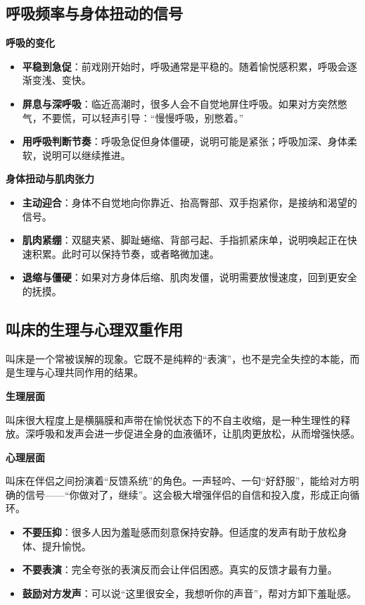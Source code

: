 \documentclass[12pt,UTF8]{ctexbook}
\begin{document}
\subsection{呼吸频率与身体扭动的信号}

\textbf{呼吸的变化}

\begin{itemize}
\item \textbf{平稳到急促}：前戏刚开始时，呼吸通常是平稳的。随着愉悦感积累，呼吸会逐渐变浅、变快。
\item \textbf{屏息与深呼吸}：临近高潮时，很多人会不自觉地屏住呼吸。如果对方突然憋气，不要慌，可以轻声引导：“慢慢呼吸，别憋着。”
\item \textbf{用呼吸判断节奏}：呼吸急促但身体僵硬，说明可能是紧张；呼吸加深、身体柔软，说明可以继续推进。
\end{itemize}

\textbf{身体扭动与肌肉张力}

\begin{itemize}
\item \textbf{主动迎合}：身体不自觉地向你靠近、抬高臀部、双手抱紧你，是接纳和渴望的信号。
\item \textbf{肌肉紧绷}：双腿夹紧、脚趾蜷缩、背部弓起、手指抓紧床单，说明唤起正在快速积累。此时可以保持节奏，或者略微加速。
\item \textbf{退缩与僵硬}：如果对方身体后缩、肌肉发僵，说明需要放慢速度，回到更安全的抚摸。
\end{itemize}

\subsection{叫床的生理与心理双重作用}

叫床是一个常被误解的现象。它既不是纯粹的“表演”，也不是完全失控的本能，而是生理与心理共同作用的结果。

\textbf{生理层面}

叫床很大程度上是横膈膜和声带在愉悦状态下的不自主收缩，是一种生理性的释放。深呼吸和发声会进一步促进全身的血液循环，让肌肉更放松，从而增强快感。

\textbf{心理层面}

叫床在伴侣之间扮演着“反馈系统”的角色。一声轻吟、一句“好舒服”，能给对方明确的信号——“你做对了，继续”。这会极大增强伴侣的自信和投入度，形成正向循环。

\begin{itemize}
\item \textbf{不要压抑}：很多人因为羞耻感而刻意保持安静。但适度的发声有助于放松身体、提升愉悦。
\item \textbf{不要表演}：完全夸张的表演反而会让伴侣困惑。真实的反馈才最有力量。
\item \textbf{鼓励对方发声}：可以说“这里很安全，我想听你的声音”，帮对方卸下羞耻感。
\end{itemize}
\end{document}
